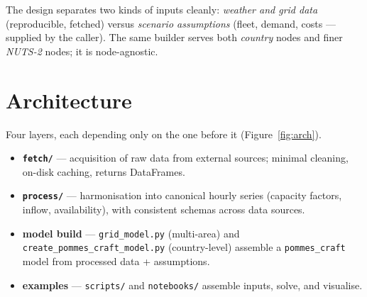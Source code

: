 \documentclass[11pt,a4paper]{article}
\begin{document}
The design separates two kinds of inputs cleanly: \emph{weather and grid data} (reproducible, fetched)
versus \emph{scenario assumptions} (fleet, demand, costs --- supplied by the caller). The same builder
serves both \emph{country} nodes and finer \emph{NUTS-2} nodes; it is node-agnostic.

\section{Architecture}
Four layers, each depending only on the one before it (Figure~\ref{fig:arch}).
\begin{itemize}[nosep]
  \item \textbf{\texttt{fetch/}} --- acquisition of raw data from external sources; minimal cleaning,
        on-disk caching, returns DataFrames.
  \item \textbf{\texttt{process/}} --- harmonisation into canonical hourly series (capacity factors,
        inflow, availability), with consistent schemas across data sources.
  \item \textbf{model build} --- \texttt{grid\_model.py} (multi-area) and
        \texttt{create\_pommes\_craft\_model.py} (country-level) assemble a \texttt{pommes\_craft}
        model from processed data + assumptions.
  \item \textbf{examples} --- \texttt{scripts/} and \texttt{notebooks/} assemble inputs, solve, and
        visualise.
\end{itemize}
\end{document}
